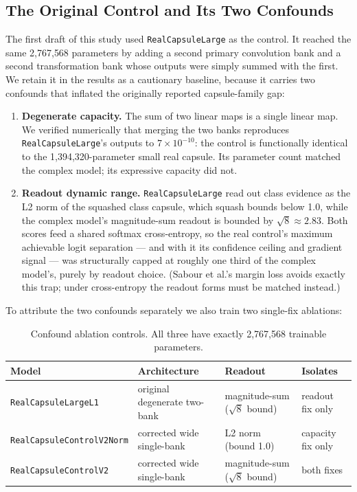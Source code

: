\documentclass[11pt]{article}
\begin{document}
\subsection{The Original Control and Its Two Confounds}
\label{sec:confounds}
The first draft of this study used \texttt{RealCapsuleLarge} as the control. It reached the same 2{,}767{,}568 parameters by adding a second primary convolution bank and a second transformation bank whose outputs were simply summed with the first. We retain it in the results as a cautionary baseline, because it carries two confounds that inflated the originally reported capsule-family gap:
\begin{enumerate}
  \item \textbf{Degenerate capacity.} The sum of two linear maps is a single linear map. We verified numerically that merging the two banks reproduces \texttt{RealCapsuleLarge}'s outputs to $7 \times 10^{-10}$: the control is functionally identical to the 1{,}394{,}320-parameter small real capsule. Its parameter count matched the complex model; its expressive capacity did not.
  \item \textbf{Readout dynamic range.} \texttt{RealCapsuleLarge} read out class evidence as the L2 norm of the squashed class capsule, which squash bounds below 1.0, while the complex model's magnitude-sum readout is bounded by $\sqrt{8} \approx 2.83$. Both scores feed a shared softmax cross-entropy, so the real control's maximum achievable logit separation --- and with it its confidence ceiling and gradient signal --- was structurally capped at roughly one third of the complex model's, purely by readout choice. (Sabour et al.'s margin loss avoids exactly this trap; under cross-entropy the readout forms must be matched instead.)
\end{enumerate}

To attribute the two confounds separately we also train two single-fix ablations:

\begin{table}[t]
\centering
\small
\begin{tabularx}{\linewidth}{@{}lXXX@{}}
\toprule
Model & Architecture & Readout & Isolates \\
\midrule
\texttt{RealCapsuleLargeL1} & original degenerate two-bank & magnitude-sum ($\sqrt{8}$ bound) & readout fix only \\
\texttt{RealCapsuleControlV2Norm} & corrected wide single-bank & L2 norm (bound 1.0) & capacity fix only \\
\texttt{RealCapsuleControlV2} & corrected wide single-bank & magnitude-sum ($\sqrt{8}$ bound) & both fixes \\
\bottomrule
\end{tabularx}
\caption{Confound ablation controls. All three have exactly 2,767,568 trainable parameters.}
\label{tab:ablation-models}
\end{table}
\end{document}
